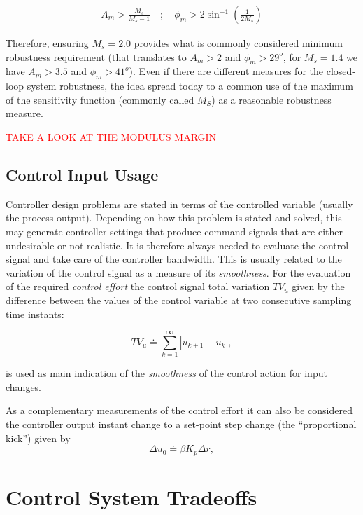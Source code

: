 \begin{eqnarray*}
    A_m > \frac{M_s}{M_s-1} \quad ; \quad \phi_m > 2 \sin^{-1} \left(\frac{1}{2 M_s} \right)
\end{eqnarray*}

Therefore, ensuring $M_s=2.0$ provides what is commonly considered minimum robustness requirement (that translates to $A_m> 2$ and $\phi_m > 29^o$, for $M_s=1.4$  we have $A_m > 3.5$ and $\phi_m > 41^o$). Even if there are different measures for the closed-loop system robustness, the idea spread today to a common use of the maximum of the sensitivity function (commonly called $M_S$) as a reasonable robustness measure.\\

\centerline{\textcolor{red}{TAKE A LOOK AT THE MODULUS MARGIN}}

\subsection{Control Input Usage}

Controller design problems are stated in terms of the controlled variable (usually the process output). Depending on how this problem is stated and solved, this may generate controller settings that produce command signals that are either undesirable or not realistic. It is therefore always needed to evaluate the control signal and take care of the controller bandwidth. This is usually related to the variation of the control signal as a measure of its \emph{smoothness}. For the evaluation of the required \emph{control effort} the control signal total variation $TV_u$ given by the difference between the values of the control variable at two consecutive sampling time instants:

\begin{equation}
	TV_u \doteq \sum^{\infty}_{k=1} \left|u_{k+1} - u_k \right|,  \label{eq:p02}
\end{equation}

\noindent is used as main indication of the \emph{smoothness} of the control action for input changes.

As a complementary measurements of the control effort it can also be considered the controller output instant change to a set-point step change (the ``proportional kick'') given by
\begin{equation}
	\Delta u_0 \doteq \beta K_p \Delta r, \label{eq:p02du}
\end{equation}


\section{Control System Tradeoffs}

